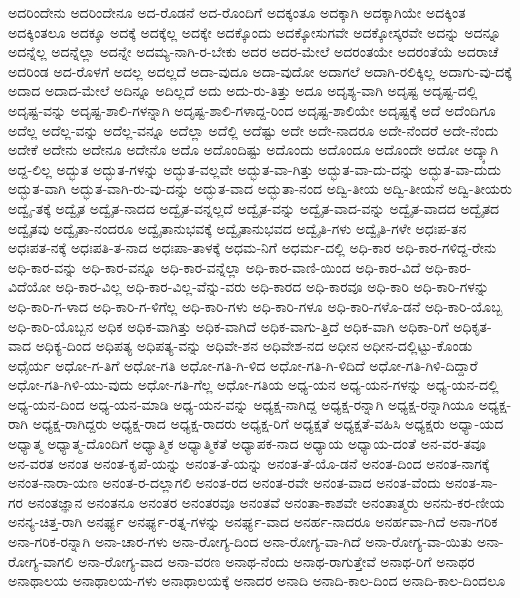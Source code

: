 {ಅದರಿಂದೇನು
ಅದರಿಂದೇನೂ
ಅದ-ರೊಡನೆ
ಅದ-ರೊಂದಿಗೆ
ಅದಕ್ಕಂತೂ
ಅದಕ್ಕಾಗಿ
ಅದಕ್ಕಾಗಿಯೇ
ಅದಕ್ಕಿಂತ
ಅದಕ್ಕಿಂತಲೂ
ಅದಕ್ಕೂ
ಅದಕ್ಕೆ
ಅದಕ್ಕೆಲ್ಲ
ಅದಕ್ಕೇ
ಅದಕ್ಕೊಂದು
ಅದಕ್ಕೋಸುಗವೇ
ಅದಕ್ಕೋಸ್ಕರವೇ
ಅದನ್ನು
ಅದನ್ನೂ
ಅದನ್ನೆಲ್ಲ
ಅದನ್ನೆಲ್ಲಾ
ಅದನ್ನೇ
ಅದಮ್ಯ-ನಾಗಿ-ರ-ಬೇಕು
ಅದರ
ಅದರ-ಮೇಲೆ
ಅದರಂತಯೇ
ಅದರಂತೆಯೆ
ಅದರಾಚೆ
ಅದರಿಂಡ
ಅದ-ರೊಳಗೆ
ಅದಲ್ಲ
ಅದಲ್ಲದೆ
ಅದಾ-ವುದೂ
ಅದಾ-ವುದೋ
ಅದಾಗಲೆ
ಅದಾಗಿ-ರಲಿಕ್ಕಿಲ್ಲ
ಅದಾಗು-ವು-ದಕ್ಕೆ
ಅದಾದ
ಅದಾದ-ಮೇಲೆ
ಅದಿನ್ನೂ
ಅದಿಲ್ಲದೆ
ಅದು
ಅದು-ರು-ತಿತ್ತು
ಅದೂ
ಅದೃಶ್ಯ-ವಾಗಿ
ಅದೃಷ್ಟ
ಅದೃಷ್ಟ-ದಲ್ಲಿ
ಅದೃಷ್ಟ-ವನ್ನು
ಅದೃಷ್ಟ-ಶಾಲಿ-ಗಳನ್ನಾಗಿ
ಅದೃಷ್ಟ-ಶಾಲಿ-ಗಳಾದ್ದ-ರಿಂದ
ಅದೃಷ್ಟ-ಶಾಲಿಯೇ
ಅದೃಷ್ಟಕ್ಕೆ
ಅದೆ
ಅದೆಂದಿಗೂ
ಅದೆಲ್ಲ
ಅದೆಲ್ಲ-ವನ್ನು
ಅದೆಲ್ಲ-ವನ್ನೂ
ಅದೆಲ್ಲಾ
ಅದೆಲ್ಲಿ
ಅದೆಷ್ಟು
ಅದೇ
ಅದೇ-ನಾದರೂ
ಅದೇ-ನೆಂದರೆ
ಅದೇ-ನೆಂದು
ಅದೇಕೆ
ಅದೇನು
ಅದೇನೂ
ಅದೇನೊ
ಅದೊ
ಅದೊಂದಿಷ್ಟು
ಅದೊಂದು
ಅದೊಂದೂ
ಅದೊಂದೇ
ಅದೋ
ಅದ್ಕ್ಕಾಗಿ
ಅದ್ದ-ಲಿಲ್ಲ
ಅದ್ಭುತ
ಅದ್ಭುತ-ಗಳನ್ನು
ಅದ್ಭುತ-ವಲ್ಲವೇ
ಅದ್ಭುತ-ವಾ-ಗಿತ್ತು
ಅದ್ಭುತ-ವಾ-ದು-ದನ್ನು
ಅದ್ಭುತ-ವಾ-ದುದು
ಅದ್ಭುತ-ವಾಗಿ
ಅದ್ಭುತ-ವಾಗಿ-ರು-ವು-ದನ್ನು
ಅದ್ಭುತ-ವಾದ
ಅದ್ಭುತಾ-ನಂದ
ಅದ್ವಿ-ತೀಯ
ಅದ್ವಿ-ತೀಯನೆ
ಅದ್ವಿ-ತೀಯರು
ಅದ್ವೈ-ತಕ್ಕೆ
ಅದ್ವೈತ
ಅದ್ವೈತ-ನಾದದ
ಅದ್ವೈತ-ವನ್ನಲ್ಲದೆ
ಅದ್ವೈತ-ವನ್ನು
ಅದ್ವೈತ-ವಾದ-ವನ್ನು
ಅದ್ವೈತ-ವಾದದ
ಅದ್ವೈತದ
ಅದ್ವೈತವು
ಅದ್ವೈತಾ-ನಂದರೂ
ಅದ್ವೈತಾನುಭವಕ್ಕೆ
ಅದ್ವೈತಾನುಭವದ
ಅದ್ವೈತಿ-ಗಳು
ಅದ್ವೈತಿ-ಗಳೇ
ಅಧಃಪ-ತನ
ಅಧಃಪತ-ನಕ್ಕೆ
ಅಧಃಪತಿ-ತ-ನಾದ
ಅಧಃಪಾ-ತಾಳಕ್ಕೆ
ಅಧಮ-ನಿಗೆ
ಅಧರ್ಮ-ದಲ್ಲಿ
ಅಧಿ-ಕಾರ
ಅಧಿ-ಕಾರ-ಗಳಿದ್ದ-ರೇನು
ಅಧಿ-ಕಾರ-ವನ್ನು
ಅಧಿ-ಕಾರ-ವನ್ನೂ
ಅಧಿ-ಕಾರ-ವನ್ನೆಲ್ಲಾ
ಅಧಿ-ಕಾರ-ವಾಣಿ-ಯಿಂದ
ಅಧಿ-ಕಾರ-ವಿದೆ
ಅಧಿ-ಕಾರ-ವಿದೆಯೋ
ಅಧಿ-ಕಾರ-ವಿಲ್ಲ
ಅಧಿ-ಕಾರ-ವಿಲ್ಲ-ವೆನ್ನು-ವರು
ಅಧಿ-ಕಾರದ
ಅಧಿ-ಕಾರವೂ
ಅಧಿ-ಕಾರಿ
ಅಧಿ-ಕಾರಿ-ಗಳನ್ನು
ಅಧಿ-ಕಾರಿ-ಗ-ಳಾದ
ಅಧಿ-ಕಾರಿ-ಗ-ಳಿಗೆಲ್ಲ
ಅಧಿ-ಕಾರಿ-ಗಳು
ಅಧಿ-ಕಾರಿ-ಗಳೂ
ಅಧಿ-ಕಾರಿ-ಗಳೊ-ಡನೆ
ಅಧಿ-ಕಾರಿ-ಯೊಬ್ಬ
ಅಧಿ-ಕಾರಿ-ಯೊಬ್ಬನ
ಅಧಿಕ
ಅಧಿಕ-ವಾಗಿತ್ತು
ಅಧಿಕ-ವಾಗಿದೆ
ಅಧಿಕ-ವಾಗು-ತ್ತಿದೆ
ಅಧಿಕ-ವಾಗಿ
ಅಧಿಕಾ-ರಿಗೆ
ಅಧಿಕೃತ-ವಾದ
ಅಧಿಕ್ಯ-ದಿಂದ
ಅಧಿಪತ್ಯ
ಅಧಿಪತ್ಯ-ವನ್ನು
ಅಧಿವೇ-ಶನ
ಅಧಿವೇಶ-ನದ
ಅಧೀನ
ಅಧೀನ-ದಲ್ಲಿಟ್ಟು-ಕೊಂಡು
ಅಧೈರ್ಯ
ಅಧೋ-ಗ-ತಿಗೆ
ಅಧೋ-ಗತಿ
ಅಧೋ-ಗತಿ-ಗಿ-ಳಿದ
ಅಧೋ-ಗತಿ-ಗಿ-ಳಿದಿದೆ
ಅಧೋ-ಗತಿ-ಗಿಳಿ-ದಿದ್ದಾರೆ
ಅಧೋ-ಗತಿ-ಗಿಳಿ-ಯು-ವುದು
ಅಧೋ-ಗತಿ-ಗೆಲ್ಲ
ಅಧೋ-ಗತಿಯ
ಅಧ್ಯ-ಯನ
ಅಧ್ಯ-ಯನ-ಗಳನ್ನು
ಅಧ್ಯ-ಯನ-ದಲ್ಲಿ
ಅಧ್ಯ-ಯನ-ದಿಂದ
ಅಧ್ಯ-ಯನ-ಮಾಡಿ
ಅಧ್ಯ-ಯನ-ವನ್ನು
ಅಧ್ಯಕ್ಷ-ನಾಗಿದ್ದ
ಅಧ್ಯಕ್ಷ-ರನ್ನಾಗಿ
ಅಧ್ಯಕ್ಷ-ರನ್ನಾಗಿಯೂ
ಅಧ್ಯಕ್ಷ-ರಾಗಿ
ಅಧ್ಯಕ್ಷ-ರಾಗಿದ್ದರು
ಅಧ್ಯಕ್ಷ-ರಾದ
ಅಧ್ಯಕ್ಷ-ರಾದರು
ಅಧ್ಯಕ್ಷ-ರಿಗೆ
ಅಧ್ಯಕ್ಷತೆ
ಅಧ್ಯಕ್ಷತೆ-ವಹಿಸಿ
ಅಧ್ಯಕ್ಷರು
ಅಧ್ಯಾ-ಯದ
ಅಧ್ಯಾತ್ಮ
ಅಧ್ಯಾತ್ಮ-ದೊಂದಿಗೆ
ಅಧ್ಯಾತ್ಮಿಕ
ಅಧ್ಯಾತ್ಮಿಕತೆ
ಅಧ್ಯಾಪಕ-ನಾದ
ಅಧ್ಯಾಯ
ಅಧ್ಯಾಯ-ದಂತೆ
ಅನ-ವರ-ತವೂ
ಅನ-ವರತ
ಅನಂತ
ಅನಂತ-ಕೃಪೆ-ಯನ್ನು
ಅನಂತ-ತೆ-ಯನ್ನು
ಅನಂತ-ತೆ-ಯೊ-ಡನೆ
ಅನಂತ-ದಿಂದ
ಅನಂತ-ನಾಗಕ್ಕೆ
ಅನಂತ-ನಾರಾ-ಯಣ
ಅನಂತ-ರ-ದಲ್ಲಾಗಲಿ
ಅನಂತ-ರದ
ಅನಂತ-ರವೇ
ಅನಂತ-ವಾದ
ಅನಂತ-ವೆಂದು
ಅನಂತ-ಸಾ-ಗರ
ಅನಂತಜ್ಞಾನ
ಅನಂತನೂ
ಅನಂತರ
ಅನಂತರವೂ
ಅನಂತವೆ
ಅನಂತಾ-ಕಾಶವೇ
ಅನಂತಾತ್ಮರು
ಅನನು-ಕರ-ಣೀಯ
ಅನನ್ಯ-ಚಿತ್ತ-ರಾಗಿ
ಅನರ್ಘ್ಯ
ಅನರ್ಘ್ಯ-ರತ್ನ-ಗಳನ್ನು
ಅನರ್ಘ್ಯ-ವಾದ
ಅನರ್ಹ-ನಾದರೂ
ಅನರ್ಹವಾ-ಗಿದೆ
ಅನಾ-ಗರಿಕ
ಅನಾ-ಗರಿಕ-ರನ್ನಾಗಿ
ಅನಾ-ಚಾರ-ಗಳು
ಅನಾ-ರೋಗ್ಯ-ದಿಂದ
ಅನಾ-ರೋಗ್ಯ-ವಾ-ಗಿದೆ
ಅನಾ-ರೋಗ್ಯ-ವಾ-ಯಿತು
ಅನಾ-ರೋಗ್ಯ-ವಾಗಲಿ
ಅನಾ-ರೋಗ್ಯ-ವಾದ
ಅನಾ-ವರಣ
ಅನಾಥ-ನೆಂದು
ಅನಾಥ-ರಾಗುತ್ತೇವೆ
ಅನಾಥ-ರಿಗೆ
ಅನಾಥರ
ಅನಾಥಾಲಯ
ಅನಾಥಾಲಯ-ಗಳು
ಅನಾಥಾಲಯಕ್ಕೆ
ಅನಾದರ
ಅನಾದಿ
ಅನಾದಿ-ಕಾಲ-ದಿಂದ
ಅನಾದಿ-ಕಾಲ-ದಿಂದಲೂ
}

